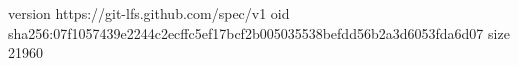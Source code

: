 version https://git-lfs.github.com/spec/v1
oid sha256:07f1057439e2244c2ecffc5ef17bcf2b005035538befdd56b2a3d6053fda6d07
size 21960
